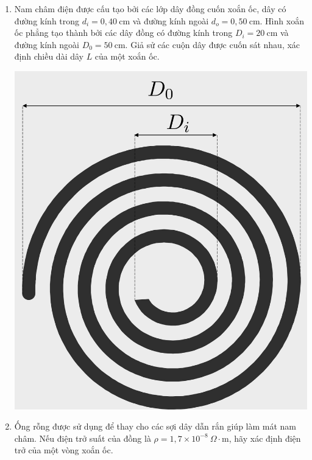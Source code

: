 \begin{vd}
\begin{enumerate}[1)]
\begin{center}

    \end{center}
    \item Nam châm điện được cấu tạo bởi các lớp dây đồng cuốn xoắn ốc, dây có đường kính trong $d_i=0,40~\mathrm{cm}$ và đường kính ngoài $d_o=0,50~\mathrm{cm}$. Hình xoắn ốc phẳng tạo thành bởi các dây đồng có đường kính trong $D_i=20~\mathrm{cm}$ và đường kính ngoài $D_0=50~\mathrm{cm}$. Giả sử các cuộn dây được cuốn sát nhau, xác định chiều dài dây $L$ của một xoắn ốc.
    \begin{center}
        \includegraphics[scale=0.4]{Anh/xoanoc.jpg}
    \end{center}
    \item Ống rỗng được sử dụng để thay cho các sợi dây dẫn rắn giúp làm mát nam châm. Nếu điện trở suất của đồng là $\rho=1,7\times10^{-8}~\Omega\cdot \mathrm{m}$, hãy xác định điện trở của một vòng xoắn ốc.

\end{enumerate}
\end{vd}
